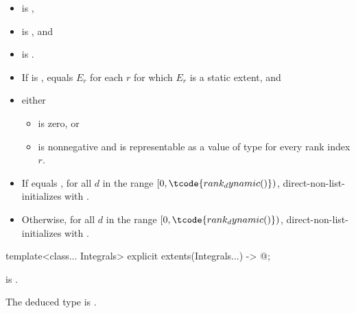 \begin{itemdescr}
\pnum
\constraints
\begin{itemize}
\item
{} is ,
\item
{} is , and
\item
{} is .
\end{itemize}

\pnum
\expects
\begin{itemize}
\item
If  is ,
 equals $E_r$ for each $r$ for which $E_r$ is a static extent, and
\item
either
\begin{itemize}
\item
{} is zero, or
\item
{} is nonnegative and
is representable as a value of type  for every rank index $r$.
\end{itemize}
\end{itemize}

\pnum
\effects
\begin{itemize}
\item
If  equals ,
for all $d$ in the range $[0, \tcode{rank_dynamic()})$,
direct-non-list-initializes 
with .
\item
Otherwise, for all $d$ in the range $[0, \tcode{rank_dynamic()})$,
direct-non-list-initializes \tcode{[$d$]}
with .
\end{itemize}
\end{itemdescr}

%
\begin{itemdecl}
template<class... Integrals>
  explicit extents(Integrals...) -> @\seebelow@;
\end{itemdecl}

\begin{itemdescr}
\pnum
\constraints
{} is .

\pnum
\remarks
The deduced type is .
\end{itemdescr}

